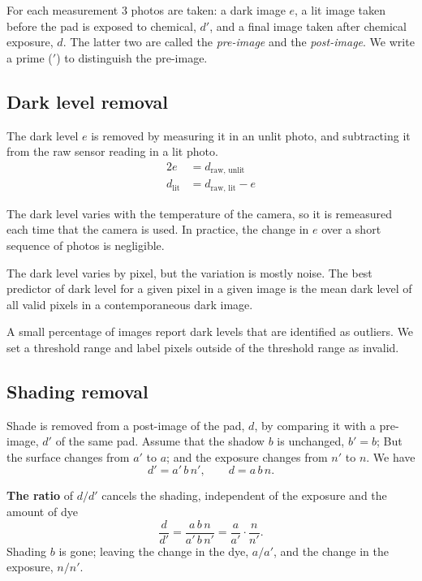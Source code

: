 \documentclass[11pt,letter]{article}
\begin{document}
For each measurement 3 photos are taken:  
a dark image $e$, 
a lit image taken before the pad is exposed to chemical, $d'$, 
and a final image taken after chemical exposure, $d$. 
The latter two are called the \textit{pre-image} and the \textit{post-image}. 
We write a prime ($'$) to distinguish the pre-image. 

\subsection{Dark level removal}

The dark level $e$ is removed by measuring it in an unlit photo, and subtracting it from the raw sensor reading in a lit photo.
\begin{alignat}{2}
	e & = d_\text{raw, unlit}  \\
	d_\text{lit} & = d_\text{raw, lit} - e
\end{alignat}

The dark level varies with the temperature of the camera, so it is remeasured each time that the camera is used.
In practice, the change in $e$ over a short sequence of photos is negligible.

The dark level varies by pixel, but the variation is mostly noise. 
The best predictor of dark level for a given pixel in a given image is the mean dark level of all valid pixels in a contemporaneous dark image.   

A small percentage of images report dark levels that are identified as outliers.
We set a threshold range and label pixels outside of the threshold range as invalid.

\subsection{Shading removal}

Shade is removed from a post-image of the pad, $d$, by comparing it with a pre-image, $d'$ of the same pad.
Assume that the shadow $b$ is unchanged, $b' = b$; 
But the surface changes from $a'$ to $a$; 
and the exposure changes from $n'$ to $n$.
We have
\begin{equation}
  d' = a'\, b\, n', \qquad d = a\, b\, n .
  \label{eq:te}
\end{equation}

\noindent\textbf{The ratio} of $d / d'$ cancels the shading, independent of the exposure and the amount of dye 
\begin{equation}
  \frac{d}{d'} = \frac{a\, b\, n}{a'\, b\, n'}
  = \frac{a}{a'} \cdot \frac{n}{n'} .
  \label{eq:te-ratio}
\end{equation}
Shading $b$ is gone;  
leaving the change in the dye, $a/a'$, 
and the change in the exposure, $n/n'$.
\end{document}
